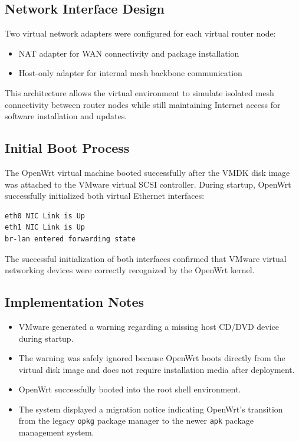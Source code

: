 \documentclass[conference]{IEEEtran}
\begin{document}
\subsection{Network Interface Design}

Two virtual network adapters were configured for each virtual router node:

\begin{itemize}
    \item NAT adapter for WAN connectivity and package installation
    \item Host-only adapter for internal mesh backbone communication
\end{itemize}

This architecture allows the virtual environment to simulate isolated mesh connectivity between router nodes while still maintaining Internet access for software installation and updates.

\subsection{Initial Boot Process}

The OpenWrt virtual machine booted successfully after the VMDK disk image was attached to the VMware virtual SCSI controller. During startup, OpenWrt successfully initialized both virtual Ethernet interfaces:

\begin{lstlisting}
eth0 NIC Link is Up
eth1 NIC Link is Up
br-lan entered forwarding state
\end{lstlisting}

The successful initialization of both interfaces confirmed that VMware virtual networking devices were correctly recognized by the OpenWrt kernel.

\subsection{Implementation Notes}

\begin{itemize}
    \item VMware generated a warning regarding a missing host CD/DVD device during startup.
    \item The warning was safely ignored because OpenWrt boots directly from the virtual disk image and does not require installation media after deployment.
    \item OpenWrt successfully booted into the root shell environment.
    \item The system displayed a migration notice indicating OpenWrt's transition from the legacy \texttt{opkg} package manager to the newer \texttt{apk} package management system.
\end{itemize}
\end{document}

